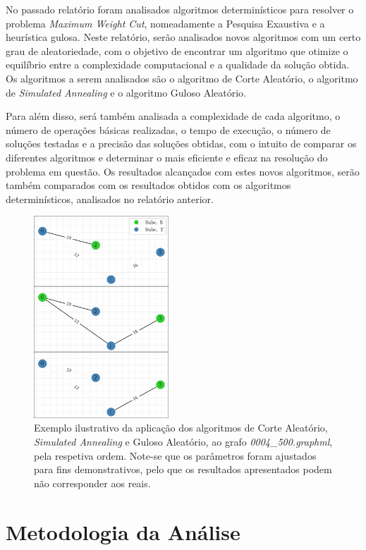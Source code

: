 \documentclass[mirror, portugues]{revdetua}
\begin{document}
No passado relatório foram analisados algoritmos determinísticos para resolver o problema \textit{Maximum Weight Cut}, nomeadamente a Pesquisa Exaustiva e a heurística gulosa. Neste relatório, serão analisados novos algoritmos com um certo grau de aleatoriedade, com o objetivo de encontrar um algoritmo que otimize o equilíbrio entre a complexidade computacional e a qualidade da solução obtida. Os algoritmos a serem analisados são o algoritmo de Corte Aleatório, o algoritmo de \textit{Simulated Annealing} e o algoritmo Guloso Aleatório.

Para além disso, será também analisada a complexidade de cada algoritmo, o número de operações básicas realizadas, o tempo de execução, o número de soluções testadas e a precisão das soluções obtidas, com o intuito de comparar os diferentes algoritmos e determinar o mais eficiente e eficaz na resolução do problema em questão. Os resultados alcançados com estes novos algoritmos, serão também comparados com os resultados obtidos com os algoritmos determinísticos, analisados no relatório anterior.

\begin{figure}[H]
    \centering
    \includegraphics[width=0.45\textwidth]{../assets/exampGraph.png}
    \caption{Exemplo ilustrativo da aplicação dos algoritmos de Corte Aleatório, \textit{Simulated Annealing} e Guloso Aleatório, ao grafo \textit{0004\_500.graphml}, pela respetiva ordem. Note-se que os parâmetros foram ajustados para fins demonstrativos, pelo que os resultados apresentados podem não corresponder aos reais.}
    \label{fig:exemplografos}
\end{figure}

\section{Metodologia da Análise}
\end{document}
